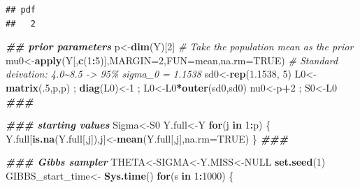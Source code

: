 \documentclass[12pt]{article}
\newenvironment{Shaded}{\begin{snugshade}}{\end{snugshade}}
\newcommand{\AttributeTok}[1]{\textcolor[rgb]{0.13,0.29,0.53}{#1}}
\newcommand{\CommentTok}[1]{\textcolor[rgb]{0.56,0.35,0.01}{\textit{#1}}}
\newcommand{\ConstantTok}[1]{\textcolor[rgb]{0.56,0.35,0.01}{#1}}
\newcommand{\ControlFlowTok}[1]{\textcolor[rgb]{0.13,0.29,0.53}{\textbf{#1}}}
\newcommand{\DecValTok}[1]{\textcolor[rgb]{0.00,0.00,0.81}{#1}}
\newcommand{\DocumentationTok}[1]{\textcolor[rgb]{0.56,0.35,0.01}{\textbf{\textit{#1}}}}
\newcommand{\FloatTok}[1]{\textcolor[rgb]{0.00,0.00,0.81}{#1}}
\newcommand{\FunctionTok}[1]{\textcolor[rgb]{0.13,0.29,0.53}{\textbf{#1}}}
\newcommand{\NormalTok}[1]{#1}
\newcommand{\OtherTok}[1]{\textcolor[rgb]{0.56,0.35,0.01}{#1}}
\newcommand{\SpecialCharTok}[1]{\textcolor[rgb]{0.81,0.36,0.00}{\textbf{#1}}}
\begin{document}
\begin{verbatim}
## pdf 
##   2
\end{verbatim}

\begin{Shaded}
\begin{Highlighting}[]
\DocumentationTok{\#\# prior parameters}
\NormalTok{p}\OtherTok{\textless{}{-}}\FunctionTok{dim}\NormalTok{(Y)[}\DecValTok{2}\NormalTok{]}
\CommentTok{\# Take the population mean as the prior}
\NormalTok{mu0}\OtherTok{\textless{}{-}}\FunctionTok{apply}\NormalTok{(Y[,}\FunctionTok{c}\NormalTok{(}\DecValTok{1}\SpecialCharTok{:}\DecValTok{5}\NormalTok{)],}\AttributeTok{MARGIN=}\DecValTok{2}\NormalTok{,}\AttributeTok{FUN=}\NormalTok{mean,}\AttributeTok{na.rm=}\ConstantTok{TRUE}\NormalTok{)}
\CommentTok{\# Standard deivation: 4.0\textasciitilde{}8.5 {-}\textgreater{} 95\% sigma\_0 = 1.1538}
\NormalTok{sd0}\OtherTok{\textless{}{-}}\FunctionTok{rep}\NormalTok{(}\FloatTok{1.1538}\NormalTok{, }\DecValTok{5}\NormalTok{)}
\NormalTok{L0}\OtherTok{\textless{}{-}}\FunctionTok{matrix}\NormalTok{(.}\DecValTok{5}\NormalTok{,p,p) ; }\FunctionTok{diag}\NormalTok{(L0)}\OtherTok{\textless{}{-}}\DecValTok{1}\NormalTok{ ; L0}\OtherTok{\textless{}{-}}\NormalTok{L0}\SpecialCharTok{*}\FunctionTok{outer}\NormalTok{(sd0,sd0)}
\NormalTok{nu0}\OtherTok{\textless{}{-}}\NormalTok{p}\SpecialCharTok{+}\DecValTok{2}\NormalTok{ ; S0}\OtherTok{\textless{}{-}}\NormalTok{L0}
\DocumentationTok{\#\#\#}

\DocumentationTok{\#\#\# starting values}
\NormalTok{Sigma}\OtherTok{\textless{}{-}}\NormalTok{S0}
\NormalTok{Y.full}\OtherTok{\textless{}{-}}\NormalTok{Y}
\ControlFlowTok{for}\NormalTok{(j }\ControlFlowTok{in} \DecValTok{1}\SpecialCharTok{:}\NormalTok{p)}
\NormalTok{\{}
\NormalTok{  Y.full[}\FunctionTok{is.na}\NormalTok{(Y.full[,j]),j]}\OtherTok{\textless{}{-}}\FunctionTok{mean}\NormalTok{(Y.full[,j],}\AttributeTok{na.rm=}\ConstantTok{TRUE}\NormalTok{)}
\NormalTok{\}}
\DocumentationTok{\#\#\#}

\DocumentationTok{\#\#\# Gibbs sampler}
\NormalTok{THETA}\OtherTok{\textless{}{-}}\NormalTok{SIGMA}\OtherTok{\textless{}{-}}\NormalTok{Y.MISS}\OtherTok{\textless{}{-}}\ConstantTok{NULL}
\FunctionTok{set.seed}\NormalTok{(}\DecValTok{1}\NormalTok{)}
\NormalTok{GIBBS\_start\_time}\OtherTok{\textless{}{-}} \FunctionTok{Sys.time}\NormalTok{()}
\ControlFlowTok{for}\NormalTok{(s }\ControlFlowTok{in} \DecValTok{1}\SpecialCharTok{:}\DecValTok{1000}\NormalTok{)}
\NormalTok{\{}


\end{Highlighting}
\end{Shaded}
\end{document}
